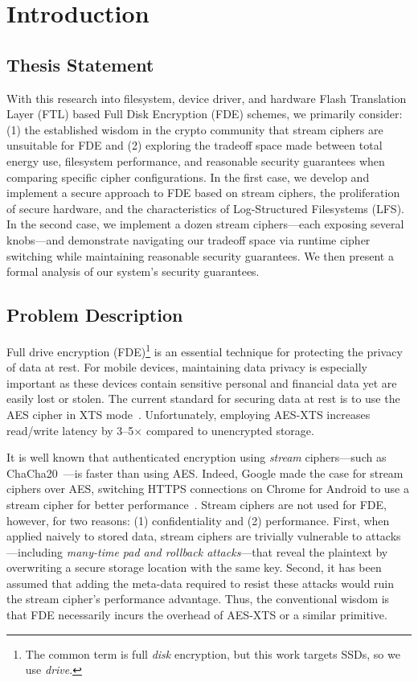 \chapter{Introduction} \label{chp:introduction}

\section{Thesis Statement}

With this research into filesystem, device driver, and hardware Flash
Translation Layer (FTL) based Full Disk Encryption (FDE) schemes, we primarily
consider: (1) the established wisdom in the crypto community that stream ciphers
are unsuitable for FDE and (2) exploring the tradeoff space made between total
energy use, filesystem performance, and reasonable security guarantees when
comparing specific cipher configurations. In the first case, we develop and
implement a secure approach to FDE based on stream ciphers, the proliferation of
secure hardware, and the characteristics of Log-Structured Filesystems (LFS). In
the second case, we implement a dozen stream ciphers---each exposing several
knobs---and demonstrate navigating our tradeoff space via runtime cipher
switching while maintaining reasonable security guarantees. We then present a
formal analysis of our system's security guarantees.

\section{Problem Description}

Full drive encryption (FDE)\footnote{The common term is full \emph{disk}
encryption, but this work targets SSDs, so we use \emph{drive}.} is an essential
technique for protecting the privacy of data at rest. For mobile devices,
maintaining data privacy is especially important as these devices contain
sensitive personal and financial data yet are easily lost or stolen. The current
standard for securing data at rest is to use the AES cipher in XTS
mode~\cite{XTS, NISTXTS}. Unfortunately, employing AES-XTS increases read/write
latency by 3--5$\times$ compared to unencrypted storage.

It is well known that authenticated encryption using \emph{stream}
ciphers---such as ChaCha20~\cite{ChaCha20}---is faster than using AES. Indeed,
Google made the case for stream ciphers over AES, switching HTTPS connections on
Chrome for Android to use a stream cipher for better
performance~\cite{google-blog}. Stream ciphers are not used for FDE, however,
for two reasons: (1) confidentiality and (2) performance. First, when applied
naively to stored data, stream ciphers are trivially vulnerable to
attacks---including \emph{many-time pad and rollback attacks}---that reveal the
plaintext by overwriting a secure storage location with the same key. Second, it
has been assumed that adding the meta-data required to resist these attacks
would ruin the stream cipher's performance advantage. Thus, the conventional
wisdom is that FDE necessarily incurs the overhead of AES-XTS or a similar
primitive.


